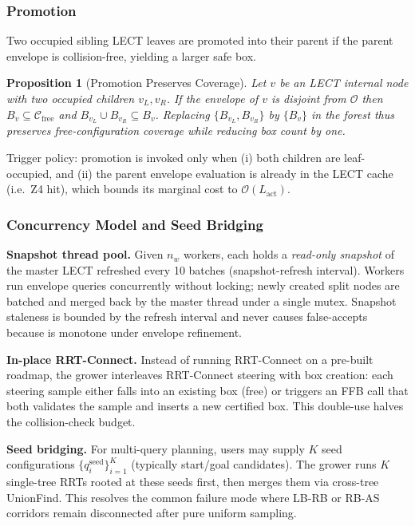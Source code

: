 \documentclass[journal]{IEEEtran}
\newtheorem{proposition}{Proposition}
\newcommand{\Cfree}{\mathcal{C}_{\mathrm{free}}}
\newcommand{\calO}{\mathcal{O}}
\begin{document}
\subsubsection{Promotion}
Two occupied sibling LECT leaves are promoted into their parent if the
parent envelope is collision-free, yielding a larger safe box.

\begin{proposition}[Promotion Preserves Coverage]\label{prop:promotion}
Let $v$ be an LECT internal node with two occupied children
$v_L, v_R$. If the envelope of $v$ is disjoint from $\calO$ then
$B_v\subseteq\Cfree$ and $B_{v_L}\cup B_{v_R}\subseteq B_v$.
Replacing $\{B_{v_L},B_{v_R}\}$ by $\{B_v\}$ in the forest thus
preserves free-configuration coverage while reducing box count by one.
\end{proposition}

Trigger policy: promotion is invoked only when (i) both children are
leaf-occupied, and (ii) the parent envelope evaluation is already in
the LECT cache (i.e.\ Z4 hit), which bounds its marginal cost to
$\mathcal{O}(L_\text{act})$.

\subsubsection{Concurrency Model and Seed Bridging}\label{sec:grower_concurrency}

\textbf{Snapshot thread pool.}
Given $n_w$ workers, each holds a \emph{read-only snapshot} of the
master LECT refreshed every 10 batches (snapshot-refresh
interval). Workers run envelope queries concurrently without locking;
newly created split nodes are batched and merged back by the master
thread under a single mutex. Snapshot staleness is bounded by the
refresh interval and never causes false-accepts because
 is monotone under envelope refinement.

\textbf{In-place RRT-Connect.}
Instead of running RRT-Connect on a pre-built roadmap, the grower
interleaves RRT-Connect steering with box creation: each steering
sample either falls into an existing box (free) or triggers an FFB
call that both validates the sample and inserts a new certified box.
This double-use halves the collision-check budget.

\textbf{Seed bridging.}
For multi-query planning, users may supply $K$ seed configurations
$\{q_i^\text{seed}\}_{i=1}^{K}$ (typically start/goal candidates).
The grower runs $K$ single-tree RRTs rooted at these seeds first, then
merges them via cross-tree UnionFind. This resolves the common
failure mode where LB-RB or RB-AS corridors remain disconnected after
pure uniform sampling.
\end{document}
